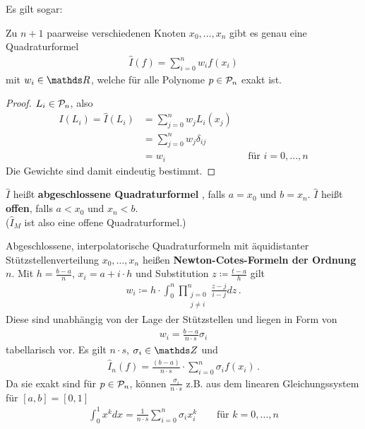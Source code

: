 \documentclass[ngerman,fontsize=11pt, paper=a4, parskip=half, titlepage=true, toc=bib]{scrbook}
\begin{document}
Es gilt sogar:
\begin{Leme}\label{7.2.1}
  Zu $n+1$ paarweise verschiedenen Knoten $x_0,\dots, x_n$
  gibt es genau eine Quadraturformel
  \begin{gather*}
    \hat{I}(f) = \sum_{i=0}^nw_if(x_i)
  \end{gather*}
  mit $w_i\in\R$, welche für alle Polynome $p\in\mathcal{P}_n$ exakt ist.

  \begin{proof}
    $L_i\in\mathcal{P}_n$, also 
    \begin{align*}
      I(L_i)=\hat{I}(L_i)&=\sum_{j=0}^{n}w_jL_i(x_j)\\
                         &=\sum_{j=0}^{n}w_j\delta_{ij}\\
                         &=w_i && \text{für } i=0,\dots,n
    \end{align*}
    Die Gewichte sind damit eindeutig bestimmt.
  \end{proof}
\end{Leme}

\begin{Defe}\label{7.2.2}
  $\hat{I}$ heißt \textbf{abgeschlossene Quadraturformel}
  ,
  falls $a=x_0$ und $b=x_n$.
  $\hat{I}$ heißt \textbf{offen}, falls $a<x_0$ und $x_n<b$.\\
  ($\hat{I}_M$ ist also eine offene Quadraturformel.)
\end{Defe}

Abgeschlossene, interpolatorische Quadraturformeln mit
äquidistanter Stützstellenverteilung $x_0, \dots, x_n$ heißen
\textbf{Newton-Cotes-Formeln der Ordnung $n$}.
Mit $h=\frac{b-a}{n}$, $x_i=a+i\cdot h$ und Substitution
$z\coloneqq \frac{t-a}{h}$ gilt
\begin{gather}
  w_i\coloneqq h
  \cdot \int_0^n \prod_{\substack{j=0\\j\neq i}}^n\frac{z-j}{i-j}dz\, .
  \label{VII.2.3}
\end{gather}
Diese sind unabhängig von der Lage der Stützstellen
und liegen in Form von
\begin{gather*}
  w_i=\frac{b-a}{n\cdot s}\sigma_i
\end{gather*}
tabellarisch vor.  Es gilt $n\cdot s$, $\sigma_i\in\Z$ und
\begin{gather}
  \hat{I}_n(f) = \frac{(b-a)}{n\cdot s}
  \cdot \sum_{i=0}^{n}\sigma_i f(x_i)\,.
  \label{VII.2.4}
\end{gather}
Da sie exakt sind für $p\in \mathcal{P}_n$,
können $\frac{\sigma_i}{n\cdot s}$ z.B. aus dem
linearen Gleichungssystem für $[a,b]=[0,1]$
\begin{gather*}
  \int_0^1x^kdx=\frac{1}{n\cdot s}\sum_{i=0}^{n}\sigma_ix_i^k
  \qquad \text{für } k=0,\dots,n
\end{gather*}
\end{document}

